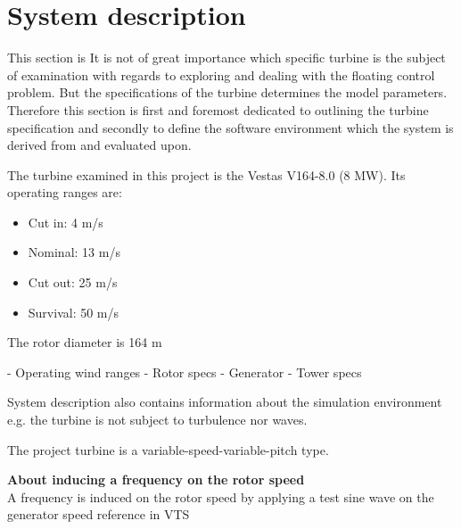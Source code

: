 \section{System description} \label{sec:sys-descr}
This section is 
It is not of great importance which specific turbine is the subject of examination with regards to exploring and dealing with the floating control problem. But the specifications of the turbine determines the model parameters. Therefore this section is first and foremost dedicated to outlining the turbine specification and secondly to define the software environment which the system is derived from and evaluated upon.

The turbine examined in this project is the Vestas V164-8.0 (8 MW). Its operating ranges are:
\begin{itemize}
	\item Cut in: 4 m/s
	\item Nominal: 13 m/s
	\item Cut out: 25 m/s
	\item Survival: 50 m/s
\end{itemize}
The rotor diameter is 164 m

- Operating wind ranges
- Rotor specs
- Generator
- Tower specs



System description also contains information about the simulation environment e.g. the turbine is not subject to turbulence nor waves.

The project turbine is a variable-speed-variable-pitch type.

\noindent \textbf{About inducing a frequency on the rotor speed}\\
A frequency is induced on the rotor speed by applying a test sine wave on the generator speed reference in VTS 

